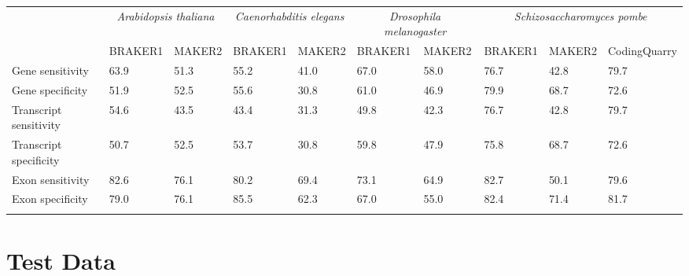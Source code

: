 \documentclass{bioinfo}
\begin{document}
\begin{methods}
\begin{table}[!b]
{\begin{tabular}{lp{.9cm}p{.9cm}p{.9cm}p{.9cm}p{.9cm}p{.9cm}p{.9cm}p{.9cm}p{.9cm}}\toprule
 & \multicolumn{2}{c}{\textit{Arabidopsis thaliana}} &  \multicolumn{2}{c}{\textit{Caenorhabditis elegans}} &  \multicolumn{2}{c}{\textit{Drosophila melanogaster}} &  \multicolumn{3}{c}{\textit{Schizosaccharomyces pombe}}\\
 & \tiny{BRAKER1} & \tiny{MAKER2} &  \tiny{BRAKER1} & \tiny{MAKER2}  & \tiny{BRAKER1} & \tiny{MAKER2} &\tiny{BRAKER1} & \tiny{MAKER2} &\tiny{CodingQuarry}\\
 \midrule
Gene sensitivity        & 63.9 & 51.3 & 55.2 & 41.0 & 67.0 & 58.0 & 76.7 & 42.8 & 79.7\\
Gene specificity        & 51.9 & 52.5 & 55.6 & 30.8 & 61.0 & 46.9 & 79.9 & 68.7 & 72.6\\
Transcript sensitivity  & 54.6 & 43.5 & 43.4 & 31.3 & 49.8 & 42.3 & 76.7 & 42.8 & 79.7\\
Transcript specificity  & 50.7 & 52.5 & 53.7 & 30.8 & 59.8 & 47.9 & 75.8 & 68.7 & 72.6\\
Exon sensitivity        & 82.6 & 76.1 & 80.2 & 69.4 & 73.1 & 64.9 & 82.7 & 50.1 & 79.6\\
Exon specificity        & 79.0 & 76.1 & 85.5 & 62.3 & 67.0 & 55.0 & 82.4 & 71.4 & 81.7\\
\botrule

\end{tabular}}{}
\end{table}

\section{Test Data}


\end{methods}
\end{document}
